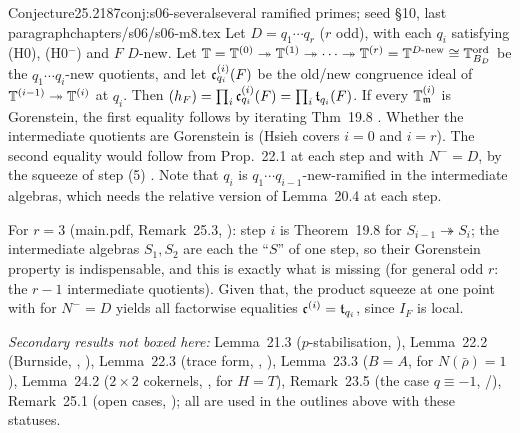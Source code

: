 \begin{quoted}{Conjecture}{25.2}{187}{conj:s06-several}{several ramified primes; seed \S10, last paragraph}{chapters/s06/s06-m8.tex}\label{rpt:conj:s06-several}
Let $D=q_1\cdots q_r$ ($r$ odd), with each $q_i$ satisfying (H0), (H0$^-$) and $F$ $D$-new. Let
$\mathbb{T}=\mathbb{T}^{(0)}\twoheadrightarrow\mathbb{T}^{(1)}\twoheadrightarrow\cdots\twoheadrightarrow\mathbb{T}^{(r)}=\mathbb{T}^{D\text{-new}}\cong\mathbb{T}^{\mathrm{ord}}_{B_D}$ be the
$q_1\cdots q_i$-new quotients, and let $\mathfrak{c}^{(i)}_{q_i}(F)$ be the old/new congruence ideal of $\mathbb{T}^{(i-1)}\twoheadrightarrow\mathbb{T}^{(i)}$ at
$q_i$. Then $(h_F)=\prod_i\mathfrak{c}^{(i)}_{q_i}(F)=\prod_i\mathfrak{t}_{q_i}(F)$. \stconj{} If every $\mathbb{T}^{(i)}_{\mathfrak{m}}$ is Gorenstein, the first
equality follows by iterating Thm~19.8 \stsketch. Whether the intermediate quotients are Gorenstein is \stopen{} (Hsieh
covers $i=0$ and $i=r$). The second equality would follow from Prop.~22.1 at each step and \cite[Thm~1.1]{KO} with
$N^-=D$, by the squeeze of step (5) \stsketch. Note that $q_i$ is $q_1\cdots q_{i-1}$-new-ramified in the intermediate algebras,
which needs the relative version of Lemma~20.4 at each step.
\end{quoted}
\noindent For $r=3$ (main.pdf, Remark~25.3, \stsketch): step $i$ is Theorem~19.8 for $S_{i-1}\twoheadrightarrow S_i$; the intermediate
algebras $S_1,S_2$ are each the ``$S$'' of one step, so their Gorenstein property is indispensable, and this is exactly what is missing
(for general odd $r$: the $r-1$ intermediate quotients). Given that, the product squeeze at one point with \cite[Thm~1.1]{KO} for $N^-=D$
yields all factorwise equalities $\mathfrak{c}^{(i)}=\mathfrak{t}_{q_i}$, since $I_F$ is local.

\noindent\emph{Secondary results not boxed here:} Lemma~21.3 ($p$-stabilisation, \stpmc), Lemma~22.2 (Burnside, \stproved, \stformal),
Lemma~22.3 (trace form, \stproved, \stformal), Lemma~23.3 ($B=A$, \stpmc{} for $N(\bar\rho)=1$), Lemma~24.2 ($2\times2$ cokernels, \stproved,
\stformal{} for $H=T$), Remark~23.5 (the case $q\equiv-1$, \stcited/\stpmc), Remark~25.1 (open cases, \stopen); all are used in the
outlines above with these statuses.

